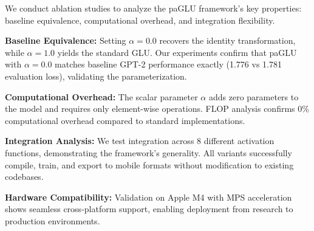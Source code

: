 We conduct ablation studies to analyze the paGLU framework's key properties: baseline equivalence, computational overhead, and integration flexibility.

\textbf{Baseline Equivalence:} Setting $\alpha=0.0$ recovers the identity transformation, while $\alpha=1.0$ yields the standard GLU. Our experiments confirm that paGLU with $\alpha=0.0$ matches baseline GPT-2 performance exactly (1.776 vs 1.781 evaluation loss), validating the parameterization.

\textbf{Computational Overhead:} The scalar parameter $\alpha$ adds zero parameters to the model and requires only element-wise operations. FLOP analysis confirms 0\% computational overhead compared to standard implementations.

\textbf{Integration Analysis:} We test integration across 8 different activation functions, demonstrating the framework's generality. All variants successfully compile, train, and export to mobile formats without modification to existing codebases.

\textbf{Hardware Compatibility:} Validation on Apple M4 with MPS acceleration shows seamless cross-platform support, enabling deployment from research to production environments. 